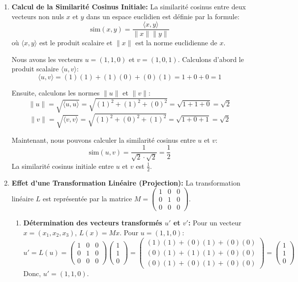 \documentclass[11pt,a4paper]{report}
\begin{document}
\begin{enumerate}
\def\labelenumi{\arabic{enumi}.}
\item
  \textbf{Calcul de la Similarité Cosinus Initiale:} La similarité
  cosinus entre deux vecteurs non nuls \(x\) et \(y\) dans un espace
  euclidien est définie par la formule:
  \[ \text{sim}(x, y) = \frac{\langle x, y \rangle}{\|x\| \|y\|} \] où
  \(\langle x, y \rangle\) est le produit scalaire et \(\|x\|\) est la
  norme euclidienne de \(x\).

  Nous avons les vecteurs \(u = (1, 1, 0)\) et \(v = (1, 0, 1)\).
  Calculons d'abord le produit scalaire \(\langle u, v \rangle\):
  \[ \langle u, v \rangle = (1)(1) + (1)(0) + (0)(1) = 1 + 0 + 0 = 1 \]

  Ensuite, calculons les normes \(\|u\|\) et \(\|v\|\):
  \[ \|u\| = \sqrt{\langle u, u \rangle} = \sqrt{(1)^2 + (1)^2 + (0)^2} = \sqrt{1 + 1 + 0} = \sqrt{2} \]
  \[ \|v\| = \sqrt{\langle v, v \rangle} = \sqrt{(1)^2 + (0)^2 + (1)^2} = \sqrt{1 + 0 + 1} = \sqrt{2} \]

  Maintenant, nous pouvons calculer la similarité cosinus entre \(u\) et
  \(v\):
  \[ \text{sim}(u, v) = \frac{1}{\sqrt{2} \cdot \sqrt{2}} = \frac{1}{2} \]
  La similarité cosinus initiale entre \(u\) et \(v\) est
  \(\frac{1}{2}\).
\item
  \textbf{Effet d'une Transformation Linéaire (Projection):} La
  transformation linéaire \(L\) est représentée par la matrice
  \(M = \begin{pmatrix} 1 & 0 & 0 \\ 0 & 1 & 0 \\ 0 & 0 & 0 \end{pmatrix}\).

  \begin{enumerate}
  \def\labelenumii{\alph{enumii}.}

  \item
    \textbf{Détermination des vecteurs transformés \(u'\) et \(v'\):}
    Pour un vecteur \(x = (x_1, x_2, x_3)\), \(L(x) = M x\). Pour
    \(u = (1, 1, 0)\):
    \[ u' = L(u) = \begin{pmatrix} 1 & 0 & 0 \\ 0 & 1 & 0 \\ 0 & 0 & 0 \end{pmatrix} \begin{pmatrix} 1 \\ 1 \\ 0 \end{pmatrix} = \begin{pmatrix} (1)(1) + (0)(1) + (0)(0) \\ (0)(1) + (1)(1) + (0)(0) \\ (0)(1) + (0)(1) + (0)(0) \end{pmatrix} = \begin{pmatrix} 1 \\ 1 \\ 0 \end{pmatrix} \]
    Donc, \(u' = (1, 1, 0)\).
  \end{enumerate}


\end{enumerate}
\end{document}
